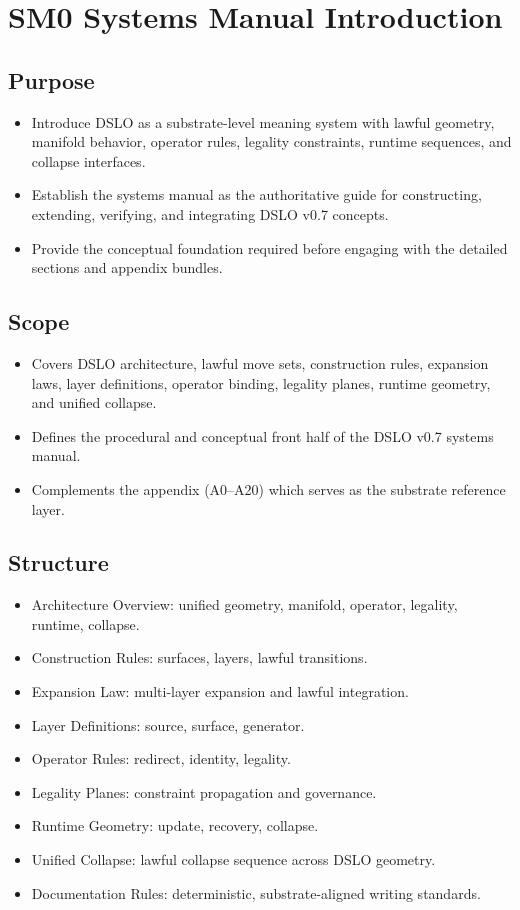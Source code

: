 \section{SM0 Systems Manual Introduction}

\subsection{Purpose}
\begin{itemize}
    \item Introduce DSLO as a substrate-level meaning system with lawful geometry, manifold behavior, operator rules, legality constraints, runtime sequences, and collapse interfaces.
    \item Establish the systems manual as the authoritative guide for constructing, extending, verifying, and integrating DSLO v0.7 concepts.
    \item Provide the conceptual foundation required before engaging with the detailed sections and appendix bundles.
\end{itemize}

\subsection{Scope}
\begin{itemize}
    \item Covers DSLO architecture, lawful move sets, construction rules, expansion laws, layer definitions, operator binding, legality planes, runtime geometry, and unified collapse.
    \item Defines the procedural and conceptual front half of the DSLO v0.7 systems manual.
    \item Complements the appendix (A0–A20) which serves as the substrate reference layer.
\end{itemize}

\subsection{Structure}
\begin{itemize}
    \item Architecture Overview: unified geometry, manifold, operator, legality, runtime, collapse.
    \item Construction Rules: surfaces, layers, lawful transitions.
    \item Expansion Law: multi-layer expansion and lawful integration.
    \item Layer Definitions: source, surface, generator.
    \item Operator Rules: redirect, identity, legality.
    \item Legality Planes: constraint propagation and governance.
    \item Runtime Geometry: update, recovery, collapse.
    \item Unified Collapse: lawful collapse sequence across DSLO geometry.
    \item Documentation Rules: deterministic, substrate-aligned writing standards.
\end{itemize}


